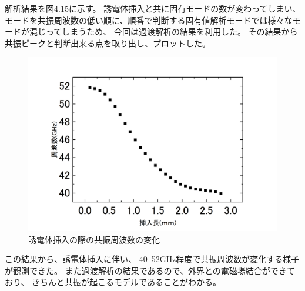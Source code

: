 解析結果を図4.15に示す。
誘電体挿入と共に固有モードの数が変わってしまい、モードを共振周波数の低い順に、順番で判断する固有値解析モードでは様々なモードが混じってしまうため、
今回は過渡解析の結果を利用した。
その結果から共振ピークと判断出来る点を取り出し、プロットした。

\vspace{10 mm}

\begin{figure}[h]
  \begin{center}
    \includegraphics[width=12cm]{./image/plot2.jpg}
    \caption{誘電体挿入の際の共振周波数の変化}
    \label{fig:result}
  \end{center}
\end{figure}

この結果から、誘電体挿入に伴い、
40~52GHz程度で共振周波数が変化する様子が観測できた。
また過渡解析の結果であるので、外界との電磁場結合ができており、
きちんと共振が起こるモデルであることがわかる。


%
%
%
%
%
